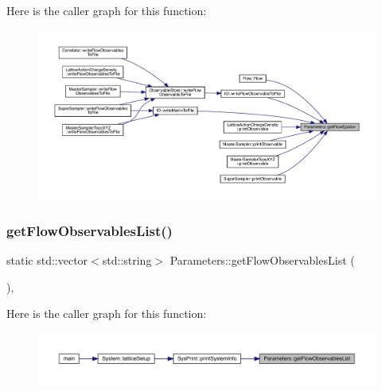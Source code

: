 Here is the caller graph for this function\+:\nopagebreak
\begin{figure}[H]
\begin{center}
\leavevmode
\includegraphics[width=350pt]{class_parameters_a96dbafc27f287de83dfaec3bc2d45efe_icgraph}
\end{center}
\end{figure}
\mbox{\label{class_parameters_a7f1edc3384a46b6e4fc5e380a8fe6d41}} 
\subsubsection{\texorpdfstring{getFlowObservablesList()}{getFlowObservablesList()}}
{\footnotesize\ttfamily static std\+::vector$<$std\+::string$>$ Parameters\+::get\+Flow\+Observables\+List (\begin{DoxyParamCaption}{ }\end{DoxyParamCaption})\hspace{0.3cm}{\ttfamily [inline]}, {\ttfamily [static]}}

Here is the caller graph for this function\+:\nopagebreak
\begin{figure}[H]
\begin{center}
\leavevmode
\includegraphics[width=350pt]{class_parameters_a7f1edc3384a46b6e4fc5e380a8fe6d41_icgraph}
\end{center}
\end{figure}
\mbox{\label{class_parameters_ad6dea2bb6e91a1ca4fb5e20216b40039}} 
